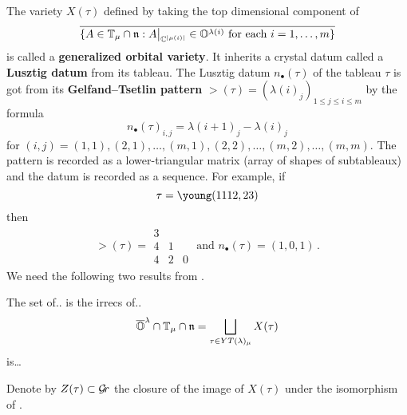\documentclass[draft]{article}
\begin{document}
The variety $X(\tau)$ defined by taking the top dimensional component of 
\[
\overline{
    \{
        A \in  \mathbb T_\mu\cap\mathfrak n : A\big|_{\mathbb C^{|\mu(i)|}} \in \mathbb O^{\lambda(i)} \text{ for each } i = 1,\dots,m
    \}
}    
\]
is called a \textbf{generalized orbital variety}. 
% 
It inherits a crystal datum called a \textbf{Lusztig datum} from its tableau. 
The Lusztig datum $n_\bullet(\tau)$ of the tableau $\tau$ is got from its \textbf{Gelfand--Tsetlin pattern} $\gt(\tau) = (\lambda(i)_j)_{1\le j\le i\le m}$  by the formula 
$$
n_\bullet(\tau)_{i,j} = \lambda(i+1)_j - \lambda(i)_j
$$
for $(i,j) = (1,1), (2,1), \dots, (m,1), (2,2),\dots,(m,2),\dots,(m,m)$. The pattern is recorded as a lower-triangular matrix (array of shapes of subtableaux) and the datum is recorded as a sequence.
% 
For example, if 
\[
    \tau = \young(1112,23) 
\]
then
\begin{gather*}
\gt(\tau) = \begin{matrix}
       3 \\
       4 & 1 \\ 
       4 & 2 & 0 
   \end{matrix} \text{ and }
   n_\bullet(\tau) = (1,0,1)\,. 
\end{gather*}
% 
% 
We need the following two results from \cite{dthesis}.
\begin{proposition}
    \label{pr:govsasirrecs}
    The set of.. is the irrecs of.. 
    \begin{equation*}
        \overline{\mathbb O}^\lambda\cap\mathbb T_\mu\cap\mathfrak n = \bigsqcup_{\tau\in YT(\lambda)_\mu} X(\tau)
    \end{equation*}
    is\dots
\end{proposition}
% 
Denote by $Z(\tau)\subset\mathcal{G}\!r$ the closure of the image of $X(\tau)$ under the isomorphism of . 
\end{document}
